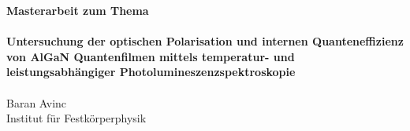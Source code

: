 
\begin{titlepage}
		\pagestyle{fancy}
		\centering\textbf{\large Masterarbeit zum Thema}\\
		\vspace{3cm} 
		\noindent{\color{RoyalPurple}\rule{\textwidth}{1pt}} \\
		\vspace{0.5cm} 
		\centering\textbf{\Huge Untersuchung der optischen Polarisation und internen Quanteneffizienz von AlGaN Quantenfilmen mittels temperatur- und leistungsabhängiger Photolumineszenzspektroskopie} \\
		\vspace{0.25cm} 
		\noindent{\color{RoyalPurple}\rule{\textwidth}{1pt}} \\
		\vspace{3cm}
		\centering Baran Avinc \\
		\vspace{3cm}
		\centering Institut für Festkörperphysik
		\vspace{\fill} \\
\end{titlepage}


